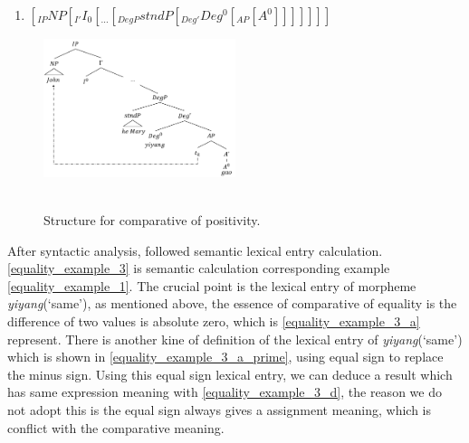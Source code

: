 \documentclass{ctexart}
\begin{document}
\begin{enumerate}
    \item \label{equality_example_2}
    $ [_{IP} NP [_{I'} I_0[_{...}[_{DegP}stndP[_{Deg'}Deg^0[_{AP}[A^0]]]]]]]$
\end{enumerate}

\begin{figure}[H]
    \centering
    \includegraphics[width=0.5\textwidth]{pic/yiyanggao.png}
    \begin{caption}
        \\ \vspace{-1.1ex}
        Structure for comparative of positivity.
    \end{caption}
\end{figure}

After syntactic analysis, followed semantic lexical entry calculation. \ref{equality_example_3} is semantic calculation corresponding example \ref{equality_example_1}. The crucial point is the lexical entry of morpheme \textit{yiyang}(`same'), as mentioned above, the essence of comparative of equality is the difference of two values is absolute zero, which is \ref{equality_example_3_a} represent. There is another kine of definition of the lexical entry of \textit{yiyang}(`same') which is shown in \ref{equality_example_3_a_prime}, using equal sign to replace the minus sign. Using this equal sign lexical entry, we can deduce a result which has same expression meaning with \ref{equality_example_3_d}, the reason we do not adopt this is the equal sign always gives a assignment meaning, which is conflict with the comparative meaning.
\end{document}
